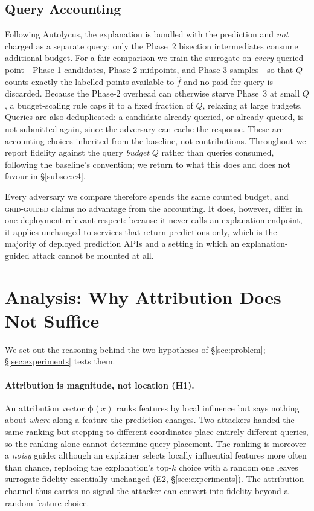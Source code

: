 \documentclass[sigconf,anonymous,review]{acmart}
\begin{document}
\subsection{Query Accounting}
\label{subsec:accounting}
Following Autolycus, the explanation is bundled with the prediction and \emph{not} charged as a
separate query; only the Phase~2 bisection intermediates consume additional budget. For a fair
comparison we train the surrogate on \emph{every} queried point---Phase-1 candidates, Phase-2
midpoints, and Phase-3 samples---so that $Q$ counts exactly the labelled points available to
$\hat{f}$ and no paid-for query is discarded. Because the Phase-2 overhead can otherwise starve
Phase~3 at small $Q$, a budget-scaling rule caps it to a fixed fraction of $Q$, relaxing at large
budgets. Queries are also deduplicated: a candidate already queried, or already queued, is not
submitted again, since the adversary can cache the response. These are accounting choices inherited
from the baseline, not contributions. Throughout we report fidelity against the query \emph{budget}
$Q$ rather than queries consumed, following the baseline's convention; we return to what this does
and does not favour in \S\ref{subsec:e4}.

Every adversary we compare therefore spends the same counted budget, and \textsc{grid-guided} claims
no advantage from the accounting. It does, however, differ in one deployment-relevant respect: because
it never calls an explanation endpoint, it applies unchanged to services that return predictions
only, which is the majority of deployed prediction APIs and a setting in which an
explanation-guided attack cannot be mounted at all.

\section{Analysis: Why Attribution Does Not Suffice}
\label{sec:analysis}
We set out the reasoning behind the two hypotheses of \S\ref{sec:problem}; \S\ref{sec:experiments}
tests them.

\paragraph{Attribution is magnitude, not location (H1).}
An attribution vector $\bm{\phi}(x)$ ranks features by local influence but says nothing about
\emph{where} along a feature the prediction changes. Two attackers handed the same ranking but
stepping to different coordinates place entirely different queries, so the ranking alone cannot
determine query placement. The ranking is moreover a \emph{noisy} guide: although an explainer
selects locally influential features more often than chance, replacing the explanation's top-$k$
choice with a random one leaves surrogate fidelity essentially unchanged (E2,
\S\ref{sec:experiments}). The attribution channel thus carries no signal the attacker can convert
into fidelity beyond a random feature choice.
\end{document}
